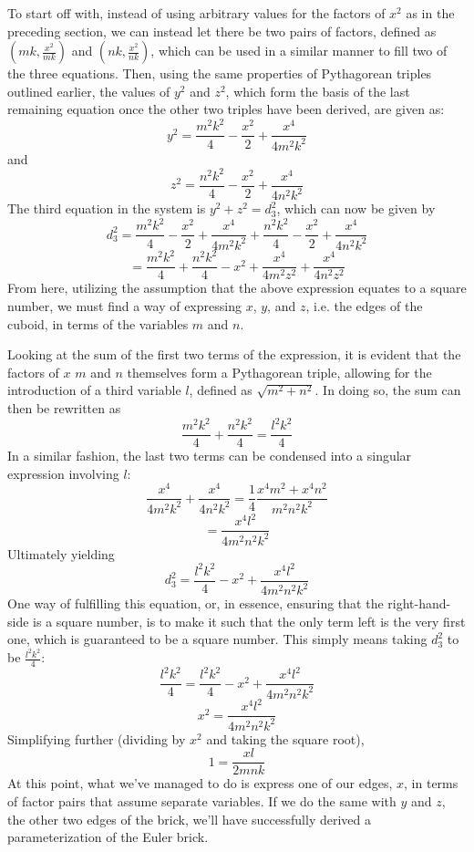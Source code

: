 \documentclass[11pt]{article}
\begin{document}
To start off with, instead of using arbitrary values for the factors of $x^2$ as in the preceding section, we can instead let there be two pairs of factors, defined as $(mk, \frac{x^2}{mk})$ and $(nk, \frac{x^2}{nk})$, which can be used in a similar manner to fill two of the three equations. Then, using the same properties of Pythagorean triples outlined earlier, the values of $y^2$ and $z^2$, which form the basis of the last remaining equation once the other two triples have been derived, are given as:
$$y^2=\frac{m^2k^2}{4}-\frac{x^2}{2}+\frac{x^4}{4m^2k^2}$$
and 
$$z^2=\frac{n^2k^2}{4}-\frac{x^2}{2}+\frac{x^4}{4n^2k^2}$$
The third equation in the system is $y^2+z^2=d_3^2$, which can now be given by 
$$d_3^2=\frac{m^2k^2}{4}-\frac{x^2}{2}+\frac{x^4}{4m^2k^2}+\frac{n^2k^2}{4}-\frac{x^2}{2}+\frac{x^4}{4n^2k^2}$$
$$=\frac{m^2k^2}{4}+\frac{n^2k^2}{4}-x^2+\frac{x^4}{4m^2z^2}+\frac{x^4}{4n^2z^2}$$
From here, utilizing the assumption that the above expression equates to a square number, we must find a way of expressing $x$, $y$, and $z$, i.e. the edges of the cuboid, in terms of the variables $m$ and $n$.

Looking at the sum of the first two terms of the expression, it is evident that the factors of $x$ $m$ and $n$ themselves form a Pythagorean triple, allowing for the introduction of a third variable $l$, defined as $\sqrt{m^2+n^2}$. In doing so, the sum can then be rewritten as
$$\frac{m^2k^2}{4}+\frac{n^2k^2}{4}=\frac{l^2k^2}{4}$$
In a similar fashion, the last two terms can be condensed into a singular expression involving $l$:
$$\frac{x^4}{4m^2k^2}+\frac{x^4}{4n^2k^2}=\frac{1}{4}\frac{x^4m^2+x^4n^2}{m^2n^2k^2}$$
$$=\frac{x^4l^2}{4m^2n^2k^2}$$
Ultimately yielding
$$d_3^2=\frac{l^2k^2}{4}-x^2+\frac{x^4l^2}{4m^2n^2k^2}$$
One way of fulfilling this equation, or, in essence, ensuring that the right-hand-side is a square number, is to make it such that the only term left is the very first one, which is guaranteed to be a square number. This simply means taking $d_3^2$ to be $\frac{l^2k^2}{4}$:
$$\frac{l^2k^2}{4}=\frac{l^2k^2}{4}-x^2+\frac{x^4l^2}{4m^2n^2k^2}$$
$$x^2=\frac{x^4l^2}{4m^2n^2k^2}$$
Simplifying further (dividing by $x^2$ and taking the square root), 
$$1=\frac{xl}{2mnk}$$
At this point, what we've managed to do is express one of our edges, $x$, in terms of factor pairs that assume separate variables. If we do the same with $y$ and $z$, the other two edges of the brick, we'll have successfully derived a parameterization of the Euler brick. 
\end{document}
